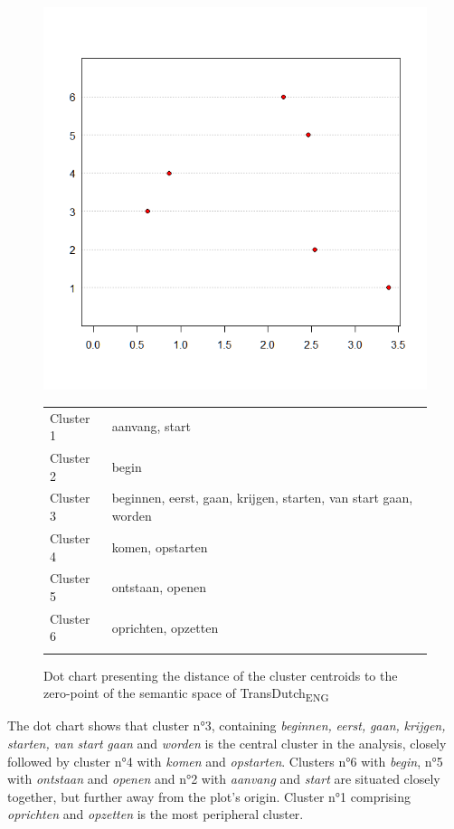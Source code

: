 \begin{figure} 
\includegraphics[height=.4\textheight]{figures/Vandevoorde2-img68.png}
\scriptsize
\begin{tabular}{ll}
\lsptoprule
Cluster 1 & aanvang, start\\
Cluster 2 & begin\\
Cluster 3 & beginnen, eerst, gaan, krijgen, starten, van start gaan, worden\\
Cluster 4 & komen, opstarten\\
Cluster 5 & ontstaan, openen\\
Cluster 6 & oprichten, opzetten\\
\lspbottomrule
\end{tabular}
\normalsize
\caption{\label{fig:4:kmeansdutch6}  Dot chart presenting the distance of the cluster centroids to the zero-point of the semantic space of TransDutch\textsubscript{ENG}}
\end{figure}

The dot chart shows that cluster n°3, containing \textit{beginnen,} \textit{eerst,} \textit{gaan,} \textit{krijgen,} \textit{starten,} \textit{van} \textit{start} \textit{gaan} and \textit{worden} is the central cluster in the analysis, closely followed by cluster n°4 with \textit{komen} and \textit{opstarten}. Clusters n°6 with \textit{begin}, n°5 with \textit{ontstaan} and \textit{openen} and n°2 with \textit{aanvang} and \textit{start} are situated closely together, but further away from the plot’s origin. Cluster n°1 comprising \textit{oprichten} and \textit{opzetten} is the most peripheral cluster.

